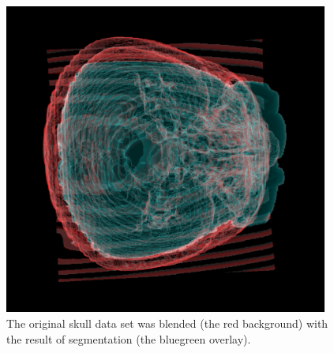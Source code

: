 \begin{figure}
    \centering
    \includegraphics[width=0.95\textwidth]{data/png/merged}
    \caption[3d blending of original and segmentationed images]{
The original skull data set was blended (the red background) with the result of segmentation (the bluegreen overlay).
}
    \label{fg:merged}
\end{figure}
